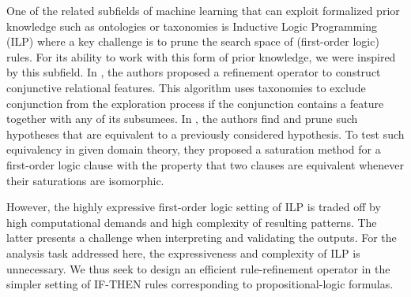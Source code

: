 \documentclass{bmcart}
\begin{document}
One of the related subfields of machine learning that can exploit formalized prior knowledge such as ontologies or taxonomies is Inductive Logic Programming (ILP) \cite{deraedt2016srl} where a key challenge is to prune the search space of (first-order logic) rules. For its ability to work with this form of prior knowledge, we were inspired by this subfield. In \cite{vzakova2007exploiting}, the authors proposed a refinement operator to construct conjunctive relational features. This algorithm uses taxonomies to exclude conjunction from the exploration process if the conjunction contains a feature together with any of its subsumees. In \cite{svatovs2017pruning}, the authors find and prune such hypotheses that are equivalent to a previously considered hypothesis. To test such equivalency in given domain theory, they proposed a saturation method for a first-order logic clause with the property that two clauses are equivalent whenever their saturations are isomorphic. 

However, the highly expressive first-order logic setting of ILP is traded off by high computational demands and high complexity of resulting patterns. The latter presents a challenge when interpreting and validating the outputs. For the analysis task addressed here, the expressiveness and complexity of ILP is unnecessary. We thus seek to design an efficient rule-refinement operator in the simpler setting of IF-THEN rules corresponding to propositional-logic formulas.
\end{document}
